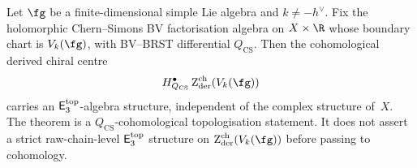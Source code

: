 \begin{theorem}
\label{thm:E3-topological-km}
Let $\fg$ be a finite-dimensional simple Lie algebra and
$k \ne -h^\vee$.  Fix the holomorphic Chern--Simons BV
factorisation algebra on \(X\times\R\) whose boundary chart is
\(V_k(\fg)\), with BV--BRST differential \(Q_{\mathrm{CS}}\).  Then
the cohomological derived chiral centre
\[
H^\bullet_{Q_{\mathrm{CS}}}\Zder^{\mathrm{ch}}(V_k(\fg))
\]
carries an \(\mathsf{E}_3^{\mathrm{top}}\)-algebra structure, independent
of the complex structure of~\(X\).  The theorem is a
\(Q_{\mathrm{CS}}\)-cohomological topologisation statement.  It does
not assert a strict raw-chain-level \(\mathsf{E}_3^{\mathrm{top}}\)
structure on \(\Zder^{\mathrm{ch}}(V_k(\fg))\) before passing to
cohomology.
\end{theorem}

